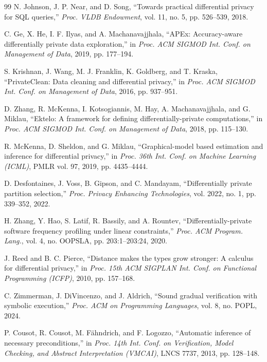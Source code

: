 \begin{thebibliography}{99}
N. Johnson, J. P. Near, and D. Song, ``Towards practical differential privacy for SQL queries,''
\emph{Proc. VLDB Endowment}, vol. 11, no. 5, pp. 526--539, 2018.

C. Ge, X. He, I. F. Ilyas, and A. Machanavajjhala, ``APEx: Accuracy-aware differentially private data
exploration,'' in \emph{Proc. ACM SIGMOD Int. Conf. on Management of Data}, 2019, pp. 177--194.

S. Krishnan, J. Wang, M. J. Franklin, K. Goldberg, and T. Kraska, ``PrivateClean: Data cleaning and
differential privacy,'' in \emph{Proc. ACM SIGMOD Int. Conf. on Management of Data}, 2016,
pp. 937--951.

D. Zhang, R. McKenna, I. Kotsogiannis, M. Hay, A. Machanavajjhala, and G. Miklau, ``Ektelo: A framework
for defining differentially-private computations,'' in \emph{Proc. ACM SIGMOD Int. Conf. on Management
of Data}, 2018, pp. 115--130.

R. McKenna, D. Sheldon, and G. Miklau, ``Graphical-model based estimation and inference for differential
privacy,'' in \emph{Proc. 36th Int. Conf. on Machine Learning (ICML)}, PMLR vol. 97, 2019,
pp. 4435--4444.

D. Desfontaines, J. Voss, B. Gipson, and C. Mandayam, ``Differentially private partition selection,''
\emph{Proc. Privacy Enhancing Technologies}, vol. 2022, no. 1, pp. 339--352, 2022.

H. Zhang, Y. Hao, S. Latif, R. Bassily, and A. Rountev, ``Differentially-private software frequency
profiling under linear constraints,'' \emph{Proc. ACM Program. Lang.}, vol. 4, no. OOPSLA,
pp. 203:1--203:24, 2020.

J. Reed and B. C. Pierce, ``Distance makes the types grow stronger: A calculus for differential
privacy,'' in \emph{Proc. 15th ACM SIGPLAN Int. Conf. on Functional Programming (ICFP)}, 2010,
pp. 157--168.

C. Zimmerman, J. DiVincenzo, and J. Aldrich, ``Sound gradual verification with symbolic execution,''
\emph{Proc. ACM on Programming Languages}, vol. 8, no. POPL, 2024.

P. Cousot, R. Cousot, M. F\"ahndrich, and F. Logozzo, ``Automatic inference of necessary
preconditions,'' in \emph{Proc. 14th Int. Conf. on Verification, Model Checking, and Abstract
Interpretation (VMCAI)}, LNCS 7737, 2013, pp. 128--148.


\end{thebibliography}

